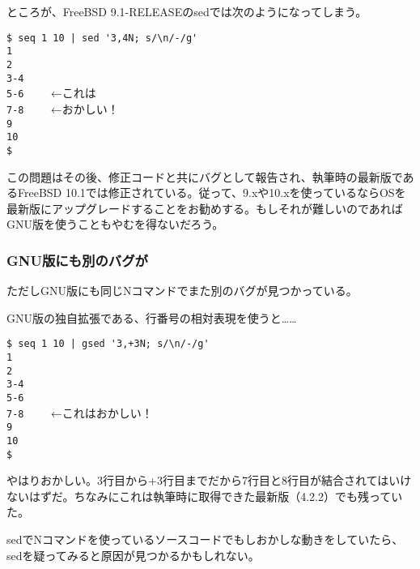 ところが、FreeBSD 9.1-RELEASEのsedでは次のようになってしまう。

\begin{screen}
	\verb!$ seq 1 10 | sed '3,4N; s/\n/-/g'! \return \\
	\verb!1! \\
	\verb!2! \\
	\verb!3-4! \\
	\verb!5-6    ! ←これは \\
	\verb!7-8    ! ←おかしい！ \\
	\verb!9! \\
	\verb!10! \\
	\verb!$ !
\end{screen}

この問題はその後、修正コードと共にバグとして報告され、執筆時の最新版であるFreeBSD 10.1では修正されている。従って、9.xや10.xを使っているならOSを最新版にアップグレードすることをお勧めする。もしそれが難しいのであればGNU版を使うこともやむを得ないだろう。

\subsubsection*{GNU版にも別のバグが}

ただしGNU版にも同じNコマンドでまた別のバグが見つかっている。

GNU版の独自拡張である、行番号の相対表現を使うと……

\begin{screen}
	\verb!$ seq 1 10 | gsed '3,+3N; s/\n/-/g'! \return \\
	\verb!1! \\
	\verb!2! \\
	\verb!3-4! \\
	\verb!5-6! \\
	\verb!7-8    ! ←これはおかしい！ \\
	\verb!9! \\
	\verb!10! \\
	\verb!$ !
\end{screen}

\noindent
やはりおかしい。3行目から+3行目までだから7行目と8行目が結合されてはいけないはずだ。ちなみにこれは執筆時に取得できた最新版（4.2.2）でも残っていた。

sedでNコマンドを使っているソースコードでもしおかしな動きをしていたら、sedを疑ってみると原因が見つかるかもしれない。
